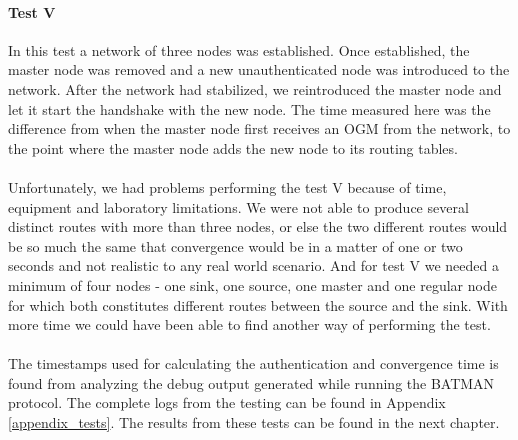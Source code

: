 \paragraph{Test V} In this test a network of three nodes was established. Once established, the master node was removed and a new unauthenticated node was introduced to the network. After the network had stabilized, we reintroduced the master node and let it start the handshake with the new node. The time measured here was the difference from when the master node first receives an OGM from the network, to the point where the master node adds the new node to its routing tables.
\\\\
Unfortunately, we had problems performing the test V because of time, equipment and laboratory limitations. We were not able to produce several distinct routes with more than three nodes, or else the two different routes would be so much the same that convergence would be in a matter of one or two seconds and not realistic to any real world scenario. And for test V we needed a minimum of four nodes - one sink, one source, one master and one regular node for which both constitutes different routes between the source and the sink. With more time we could have been able to find another way of performing the test.
\\\\
The timestamps used for calculating the authentication and convergence time is found from analyzing the debug output generated while running the BATMAN protocol. The complete logs from the testing can be found in Appendix \ref{appendix_tests}. The results from these tests can be found in the next chapter.
